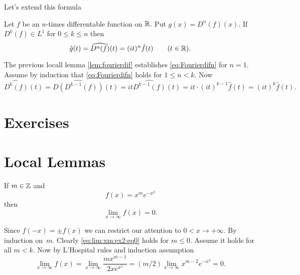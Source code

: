 Let's extend this formula
\begin{llem} \label{lem:fourierdifn}
Let $f$ be an $n$-times differentable function on \(\mathbb{R}\).
Put \(g(x)=D^n(f)(x)\).
If \(D^k(f)\in L^1\) for \(0\leq k \leq n\) then
\begin{equation} \label{eq:Fourierdifn}
\hat{g}(t) = \widehat{D^n(f)}(t) = (it)^n\hat{f}(t) \qquad (t\in\mathbb{R}).
\end{equation}
\end{llem}
\begin{thmproof}
The previous locall lemma \ref{lem:fourierdif}
establishes \eqref{eq:Fourierdifn} for \(n=1\).
Assume by induction that \eqref{eq:Fourierdifn} holds for \(1\leq n < k\).
Now
\begin{equation*}
\widehat{D^k(f)}(t) 
= \widehat{D(D^{k-1}(f))}(t) 
= it \widehat{D^{k-1}(f)}(t) 
= it \cdot (it)^{k-1}\hat{f}(t)
= (it)^k\hat{f}(t).
\end{equation*}
\end{thmproof}

\section{Exercises} %

\section{Local Lemmas} 

\begin{llem}
If \(m\in\mathbb{Z}\) and
\begin{equation*}
  f(x) = x^m e^{-x^2}
\end{equation*}
then
\begin{equation}
  \lim_{x\to\infty} f(x) = 0. \label{eq:lim:xm:ex2:eq0}
\end{equation}
\end{llem}
\begin{thmproof}
Since \(f(-x) = \pm f(x)\) we can restrict our attention to \(0<x\to+\infty\).
By induction on~$m$. Clearly \eqref{eq:lim:xm:ex2:eq0} holds for \(m \leq 0\).
Assume it holds for all \(m < k\).
Now by L'Hospital rules and induction assumption
\begin{equation*}
\lim_{x\to\infty} f(x) 
= \lim_{x\to\infty} \frac{mx^{m-1}}{2x e^{x^2}}
= (m/2) \lim_{x\to\infty} x^{m-2} e^{-x^2} = 0.
\end{equation*}
\end{thmproof}


